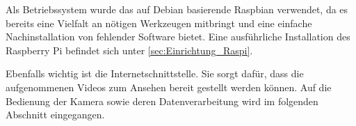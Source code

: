 Als Betriebssystem wurde das auf Debian basierende Raspbian verwendet, da es bereits eine Vielfalt an nötigen Werkzeugen mitbringt und eine einfache Nachinstallation von fehlender Software bietet. Eine ausführliche Installation des Raspberry Pi befindet sich unter \ref{sec:Einrichtung_Raspi}.

Ebenfalls wichtig ist die Internetschnittstelle. Sie sorgt dafür, dass die aufgenommenen Videos zum Ansehen bereit gestellt werden können. Auf die Bedienung der Kamera sowie deren Datenverarbeitung wird im folgenden Abschnitt eingegangen.
